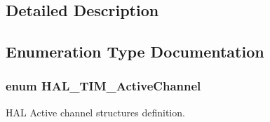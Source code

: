 \subsection{Detailed Description}


\subsection{Enumeration Type Documentation}
\subsubsection[{\texorpdfstring{H\+A\+L\+\_\+\+T\+I\+M\+\_\+\+Active\+Channel}{HAL_TIM_ActiveChannel}}]{\setlength{\rightskip}{0pt plus 5cm}enum {\bf H\+A\+L\+\_\+\+T\+I\+M\+\_\+\+Active\+Channel}}\hypertarget{group___t_i_m___exported___types_gaa3fa7bcbb4707f1151ccfc90a8cf9706}{}\label{group___t_i_m___exported___types_gaa3fa7bcbb4707f1151ccfc90a8cf9706}


H\+AL Active channel structures definition. 

